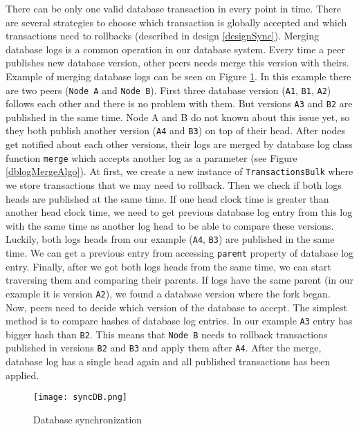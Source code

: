 There can be only one valid database transaction in every point in time. There are several strategies to choose which transaction is globally accepted and which transactions need to rollbacks (described in design \ref{designSync}). Merging database logs is a common operation in our database system. Every time a peer publishes new database version, other peers needs merge this version with theirs. Example of merging database logs can be seen on Figure \ref{syncDB}. In this example there are two peers (\texttt{Node A} and \texttt{Node B}). First three database version (\texttt{A1}, \texttt{B1}, \texttt{A2}) follows each other and there is no problem with them. But versions \texttt{A3} and \texttt{B2} are published in the same time. Node A and B do not known about this issue yet, so they both publish another version (\texttt{A4} and \texttt{B3}) on top of their head. After nodes get notified about each other versions, their logs are merged by database log class function \texttt{merge} which accepts another log as a parameter (see Figure \ref{dblogMergeAlgo}). At first, we create a new instance of \texttt{TransactionsBulk} where we store transactions that we may need to rollback. Then we check if both logs heads are published at the same time. If one head clock time is greater than another head clock time, we need to get previous database log entry from this log with the same time as another log head to be able to compare these versions. Luckily, both logs heads from our example (\texttt{A4}, \texttt{B3}) are published in the same time. We can get a previous entry from accessing \texttt{parent} property of database log entry. Finally, after we got both logs heads from the same time, we can start traversing them and comparing their parents. If logs have the same parent (in our example it is version \texttt{A2}), we found a database version where the fork began. Now, peers need to decide which version of the database to accept. The simplest method is to compare hashes of database log entries. In our example \texttt{A3} entry has bigger hash than \texttt{B2}. This means that \texttt{Node B} needs to rollback transactions published in versions \texttt{B2} and \texttt{B3} and apply them after \texttt{A4}. After the merge, database log has a single head again and all published transactions has been applied.

\begin{figure}[h]
    \centering
    \texttt{[image: syncDB.png]}
    \caption{Database synchronization}
    \label{syncDB}
\end{figure}

